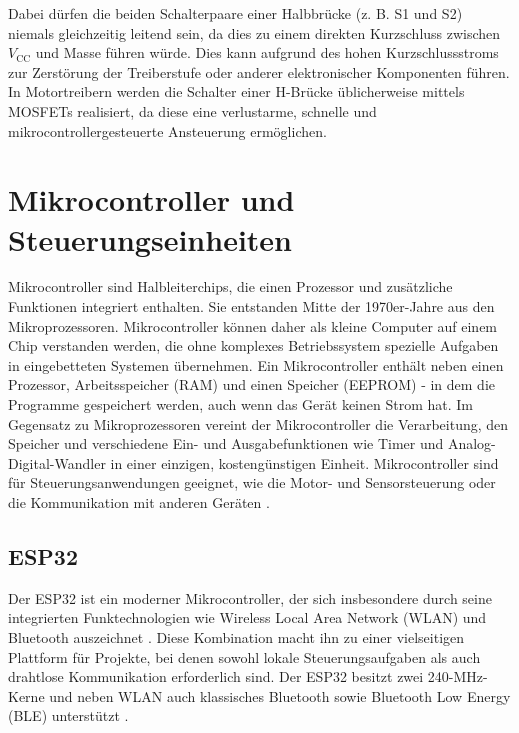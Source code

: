 Dabei dürfen die beiden Schalterpaare einer Halbbrücke (z. B. S1 und S2) niemals gleichzeitig leitend sein, da dies zu einem direkten Kurzschluss zwischen 
$V_{\mathrm{CC}}$ und Masse führen würde. Dies kann aufgrund des hohen Kurzschlussstroms zur Zerstörung der Treiberstufe oder anderer elektronischer Komponenten führen.
In Motortreibern werden die Schalter einer H-Brücke üblicherweise mittels MOSFETs realisiert, da diese eine verlustarme, schnelle und mikrocontrollergesteuerte Ansteuerung ermöglichen. \cite{hughes2019electricmotors}\cite{schröder2018leistungselektronik}

\section{Mikrocontroller und Steuerungseinheiten} %
\label{cha:Mikrocontroller und Steuerungseinheiten}

Mikrocontroller sind Halbleiterchips, die einen Prozessor und zusätzliche Funktionen integriert enthalten. Sie entstanden Mitte der 1970er-Jahre aus den Mikroprozessoren\autocite{Brandes.2024}. Mikrocontroller können daher als kleine Computer auf einem Chip verstanden werden, die ohne komplexes Betriebssystem spezielle Aufgaben in eingebetteten Systemen übernehmen. Ein Mikrocontroller enthält neben einen Prozessor, Arbeitsspeicher (RAM) und einen Speicher (EEPROM) - in dem die Programme gespeichert werden, auch wenn das Gerät keinen Strom hat. Im Gegensatz zu Mikroprozessoren vereint der Mikrocontroller die Verarbeitung, den Speicher und verschiedene Ein- und Ausgabefunktionen wie Timer und Analog-Digital-Wandler in einer einzigen, kostengünstigen Einheit. Mikrocontroller sind für Steuerungsanwendungen geeignet, wie die Motor- und Sensorsteuerung oder die Kommunikation mit anderen Geräten \autocite{IBM_Microcontroller}.

\subsection{ESP32}%
\label{cha:ESP32}

Der ESP32 ist ein moderner Mikrocontroller, der sich insbesondere durch seine integrierten Funktechnologien wie Wireless Local Area Network (WLAN) und Bluetooth auszeichnet \autocite{Cameron2023}. Diese Kombination macht ihn zu einer vielseitigen Plattform für Projekte, bei denen sowohl lokale Steuerungsaufgaben als auch drahtlose Kommunikation erforderlich sind. Der ESP32 besitzt zwei 240-MHz-Kerne und neben WLAN auch klassisches Bluetooth sowie Bluetooth Low Energy (BLE) unterstützt \autocite{Cameron2023}.

